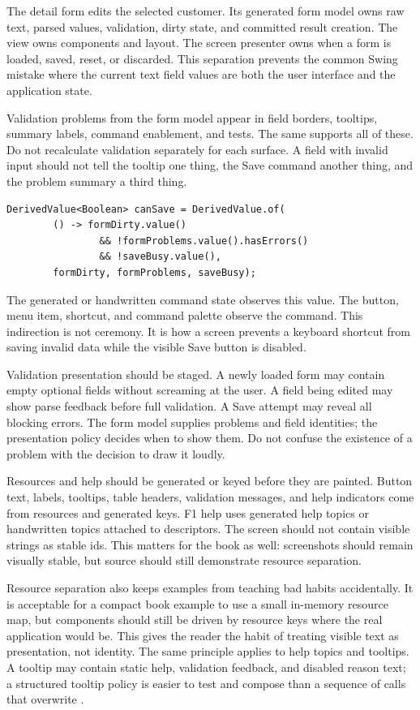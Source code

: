 The detail form edits the selected customer. Its generated form model owns raw
text, parsed values, validation, dirty state, and committed result creation.
The view owns components and layout. The screen presenter owns when a form is loaded,
saved, reset, or discarded. This separation prevents the common Swing mistake
where the current text field values are both the user interface and the
application state.

Validation problems from the form model appear in field borders, tooltips,
summary labels, command enablement, and tests. The same 
supports all of these. Do not recalculate validation separately for each
surface. A field with invalid input should not tell the tooltip one thing, the
Save command another thing, and the problem summary a third thing.

\begin{lstlisting}[caption={Save enablement from form state.}]
DerivedValue<Boolean> canSave = DerivedValue.of(
        () -> formDirty.value()
                && !formProblems.value().hasErrors()
                && !saveBusy.value(),
        formDirty, formProblems, saveBusy);
\end{lstlisting}

The generated or handwritten command state observes this value. The button,
menu item, shortcut, and command palette observe the command. This indirection
is not ceremony. It is how a screen prevents a keyboard shortcut from saving
invalid data while the visible Save button is disabled.

Validation presentation should be staged. A newly loaded form may contain
empty optional fields without screaming at the user. A field being edited may
show parse feedback before full validation. A Save attempt may reveal all
blocking errors. The form model supplies problems and field identities; the
presentation policy decides when to show them. Do not confuse the existence of
a problem with the decision to draw it loudly.

Resources and help should be generated or keyed before they are painted.
Button text, labels, tooltips, table headers, validation messages, and help
indicators come from resources and generated keys. F1 help uses generated help
topics or handwritten topics attached to descriptors. The screen should not
contain visible strings as stable ids. This matters for the book as well:
screenshots should remain visually stable, but source should still demonstrate
resource separation.

Resource separation also keeps examples from teaching bad habits accidentally.
It is acceptable for a compact book example to use a small in-memory resource
map, but components should still be driven by resource keys where the real
application would be. This gives the reader the habit of treating visible text
as presentation, not identity. The same principle applies to help topics and
tooltips. A tooltip may contain static help, validation feedback, and disabled
reason text; a structured tooltip policy is easier to test and compose than a
sequence of calls that overwrite .

